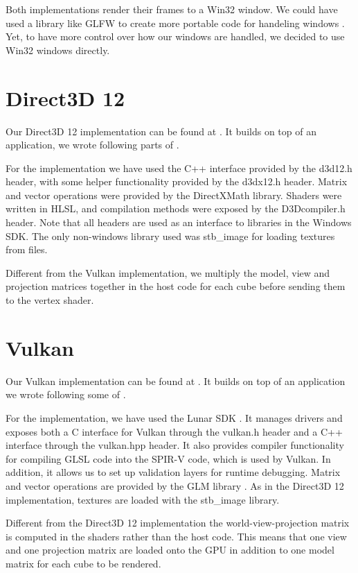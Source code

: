 Both implementations render their frames to a Win32 window.
We could have used a library like GLFW to create more portable code for handeling windows \cite{GLFW}. 
Yet, to have more control  over how our windows are handled, we decided to use Win32 windows directly.  

\section{Direct3D 12}
Our Direct3D 12 implementation can be found at \cite{DX12Git}.
It builds on top of an application, we wrote following parts of \cite{DX12Tutorial}.

For the implementation we have used the C++ interface provided by the d3d12.h header, with some helper functionality provided by the d3dx12.h header.
Matrix and vector operations were provided by the DirectXMath library. 
Shaders were written in \gls{HLSL}, and compilation methods were exposed by the D3Dcompiler.h header.
Note that all headers are used as an interface to libraries in the Windows SDK. 
The only non-windows library used was stb\_image for loading textures from files\cite{StbGit}.

Different from the Vulkan implementation, we multiply the model, view and projection matrices together in the host code for each cube before sending them to the vertex shader.    


\section{Vulkan}
Our Vulkan implementation can be found at \cite{VulkanGit}.
It builds on top of an application we wrote following some of \citet{DX12Tutorial}.

For the implementation, we have used the Lunar SDK \cite{LunarSDK}. 
It manages drivers and exposes both a C interface for Vulkan through the vulkan.h header and a C++ interface through the vulkan.hpp header. 
It also provides compiler functionality for compiling \gls{GLSL} code into the SPIR-V code, which is used by Vulkan.
In addition, it allows us to set up validation layers for runtime debugging. 
Matrix and vector operations are provided by the GLM library \cite{GLM}. 
As in the Direct3D 12 implementation, textures are loaded with the stb\_image library. 

Different from the Direct3D 12 implementation the world-view-projection matrix is computed in the shaders rather than the host code.
This means that one view and one projection matrix are loaded onto the \gls{GPU} in addition to one model matrix for each cube to be rendered.